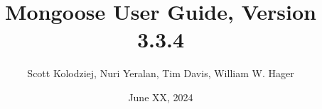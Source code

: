 \title{Mongoose User Guide, Version 3.3.4}
\author{Scott Kolodziej, Nuri Yeralan, Tim Davis, William W. Hager}
\date{June XX, 2024}
